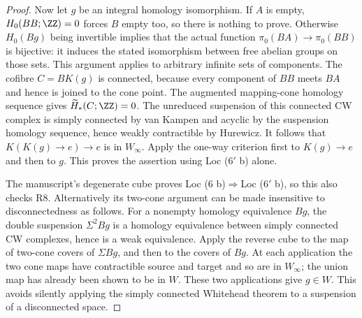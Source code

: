 \begin{proof}
Now let $g$ be an integral homology isomorphism. If $A$ is empty, $H_0(BB;\ZZ)=0$ forces $B$ empty too, so there is nothing to prove. Otherwise $H_0(Bg)$ being invertible implies that the actual function $\pi_0(BA)\to\pi_0(BB)$ is bijective: it induces the stated isomorphism between free abelian groups on those sets. This argument applies to arbitrary infinite sets of components. The cofibre $C=BK(g)$ is connected, because every component of $BB$ meets $BA$ and hence is joined to the cone point. The augmented mapping-cone homology sequence gives $\widetilde H_*(C;\ZZ)=0$. The unreduced suspension of this connected CW complex is simply connected by van Kampen and acyclic by the suspension homology sequence, hence weakly contractible by Hurewicz. It follows that $K(K(g)\to e)\to e$ is in $W_\infty$. Apply the one-way criterion first to $K(g)\to e$ and then to $g$. This proves the assertion using Loc ($6'$ b) alone.

The manuscript's degenerate cube proves Loc (6 b)$\Rightarrow$Loc ($6'$ b), so this also checks R8. Alternatively its two-cone argument can be made insensitive to disconnectedness as follows. For a nonempty homology equivalence $Bg$, the double suspension $\Sigma^2Bg$ is a homology equivalence between simply connected CW complexes, hence is a weak equivalence. Apply the reverse cube to the map of two-cone covers of $\Sigma Bg$, and then to the covers of $Bg$. At each application the two cone maps have contractible source and target and so are in $W_\infty$; the union map has already been shown to be in $W$. These two applications give $g\in W$. This avoids silently applying the simply connected Whitehead theorem to a suspension of a disconnected space.
\end{proof}
